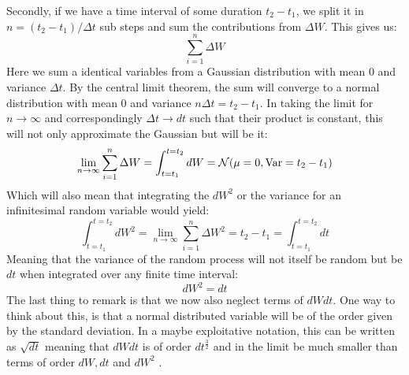 Secondly, if we have a time interval of some duration $t_2 - t_1$, we split it in $n = (t_2 - t_1)/\Delta t$ sub steps and sum the contributions from $\Delta W$. This gives us:
\begin{equation}
    \sum_{i=1}^n \Delta W
\end{equation}
Here we sum a identical variables from a Gaussian distribution with mean $0$ and variance $\Delta t$. By the central limit theorem, the sum will converge to a normal distribution with mean $0$ and variance $n \Delta{t} = t_2 - t_1$. In taking the limit for $n \to \infty$ and correspondingly $\Delta t \to dt$ such that their product is constant, this will not only approximate the Gaussian but will be it:
\begin{equation}
    \lim_{n \to \infty} \sum_{i=1}^n \Delta W = \int_{t = t_1}^{t = t_2} dW = \mathcal{N}(\mu = 0, \operatorname{Var} = t_2 - t_1)
\end{equation}
Which will also mean that integrating the $dW^2$ or the variance for an infinitesimal random variable would yield:
\begin{equation}
    \int_{t = t_1}^{t = t_2} dW^2 =  \lim_{n \to \infty} \sum_{i=1}^n \Delta W^2 = t_2 - t_1 = \int_{t = t_1}^{t = t_2} dt
\end{equation}
Meaning that the variance of the random process will not itself be random but be $dt$ when integrated over any finite time interval: 
\begin{equation}
    dW^2 = dt
\end{equation}
The last thing to remark is that we now also neglect terms of $dWdt$. One way to think about this, is that a normal distributed variable will be of the order given by the standard deviation. In a maybe exploitative notation, this can be written as $\sqrt{dt}$ meaning that $dWdt$ is of order $dt^\frac32$ and in the limit be much smaller than terms of order $dW, dt$ and $dW^2$ \cite{Gheorghiu}.





